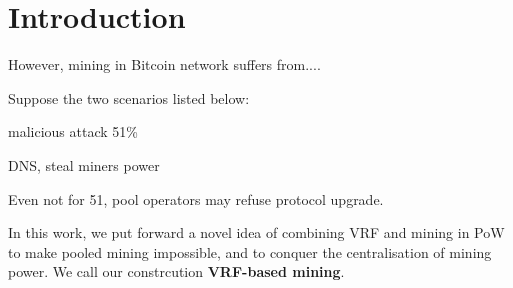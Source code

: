 \section{Introduction}




However, mining in Bitcoin network suffers from....



Suppose the two scenarios listed below:



malicious attack
51\%

DNS, steal miners power


Even not for 51, 
pool operators may refuse protocol upgrade. 


In this work, we put forward a novel idea of combining VRF and mining in PoW to make pooled mining impossible, and to conquer the centralisation of mining power.
We call our constrcution \textbf{VRF-based mining}.